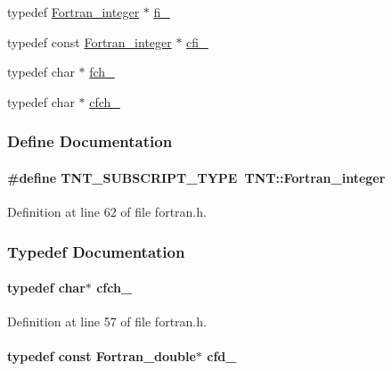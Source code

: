 \begin{DoxyCompactItemize}
\item 
typedef \hyperlink{fortran_8h_a15b7ce181271097cf077da8f76060542}{Fortran\_\-integer} $\ast$ \hyperlink{fortran_8h_a5fb0f459886dcbd01f485acca3066001}{fi\_\-}
\item 
typedef const \hyperlink{fortran_8h_a15b7ce181271097cf077da8f76060542}{Fortran\_\-integer} $\ast$ \hyperlink{fortran_8h_ab3df84a792bbb23408a136cf4825aeb4}{cfi\_\-}
\item 
typedef char $\ast$ \hyperlink{fortran_8h_a81273aba430787283a433b39887fc80b}{fch\_\-}
\item 
typedef char $\ast$ \hyperlink{fortran_8h_a58a9b627931857027cf0be46162b2d5f}{cfch\_\-}
\end{DoxyCompactItemize}


\subsubsection{Define Documentation}
\paragraph[{TNT\_\-SUBSCRIPT\_\-TYPE}]{\setlength{\rightskip}{0pt plus 5cm}\#define TNT\_\-SUBSCRIPT\_\-TYPE~{\bf TNT::Fortran\_\-integer}}\hfill\label{fortran_8h_ae204fca2c823f77ee865da86d3bf53d0}


Definition at line 62 of file fortran.h.



\subsubsection{Typedef Documentation}
\paragraph[{cfch\_\-}]{\setlength{\rightskip}{0pt plus 5cm}typedef char$\ast$ {\bf cfch\_\-}}\hfill\label{fortran_8h_a58a9b627931857027cf0be46162b2d5f}


Definition at line 57 of file fortran.h.

\paragraph[{cfd\_\-}]{\setlength{\rightskip}{0pt plus 5cm}typedef const {\bf Fortran\_\-double}$\ast$ {\bf cfd\_\-}}\hfill\label{fortran_8h_afaea8dba118cca2d0d403eb74cc3d558}


